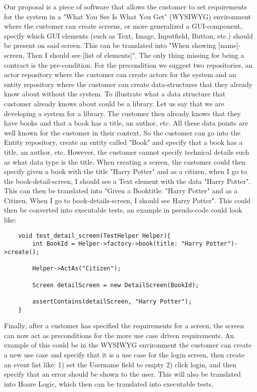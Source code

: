 Our proposal is a piece of software that allows the customer to set requirements for the system in a "What You See Is What You Get" (WYSIWYG) environment where the customer can create screens, or more generalized a GUI-component, specify which GUI elements (such as Text, Image, Inputfield, Button, etc.) should be present on said screen. 
This can be translated into "When showing [name]-screen, Then I should see [list of elements]".
The only thing missing for being a contract is the pre-condition. For the precondition we suggest two repositories, an actor repository where the customer can create actors for the system and an entity repository where the customer can create data-structures that they already know about without the system. 
To illustrate what a data structure that customer already knows about could be a library. 
Let us say that we are developing a system for a library.
The customer then already knows that they have books and that a book has a title, an author, etc. All these data points are well known for the customer in their context. 
So the customer can go into the Entity repository, create an entity called "Book" and specify that a book has a title, an author, etc. 
However, the customer cannot specify technical details such as what data type is the title. When creating a screen, the customer could then specify given a book with the title "Harry Potter" and as a citizen, when I go to the book-detail-screen, I should see a Text element with the data "Harry Potter". This can then be translated into "Given a Book{title: "Harry Potter"} and as a Citizen, When I go to book-details-screen, I should see Harry Potter". This could then be converted into executable tests, an example in pseudo-code could look like:

\begin{lstlisting}
    void test_detail_screen(TestHelper Helper){
        int BookId = Helper->factory->book(title: "Harry Potter")->create();

        Helper->ActAs("Citizen");

        Screen detailScreen = new DetailScreen(BookId);

        assertContains(detailScreen, "Harry Potter");
    }
\end{lstlisting}


Finally, after a customer has specified the requirements for a screen, the screen can now act as preconditions for the more use case driven requirements. 
An example of this could be in the WYSIWYG environment the customer can create a new use case and specify that it is a use case for the login screen, then create an event list like: 
1) set the Username field to empty 2) click login, and then specify that an error should be shown to the user. This will also be translated into Hoare Logic, which then can be translated into executable tests.
